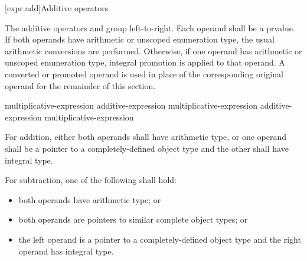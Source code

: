 %
%
%
%
%

[expr.add]{Additive operators}%
%

\pnum
The additive operators \tcode{+} and \tcode{-} group left-to-right.
Each operand shall be a prvalue.
If both operands have arithmetic or unscoped enumeration type,
the usual arithmetic conversions are performed.
Otherwise, if one operand has arithmetic or unscoped enumeration type,
integral promotion is applied to that operand.
A converted or promoted operand is used in place of
the corresponding original operand for the remainder of this section.

%
%
%
%
%
%
%
\begin{bnf}
\br
    multiplicative-expression\br
    additive-expression \terminal{+} multiplicative-expression\br
    additive-expression \terminal{-} multiplicative-expression
\end{bnf}

%
For addition, either both operands shall have arithmetic
type, or one operand shall be a pointer to a completely-defined object
type and the other shall have integral type.

\pnum
For subtraction, one of the following shall hold:
\begin{itemize}
\item both operands have arithmetic type; or

\item
{}%
both operands are pointers
to similar complete object types; or

\item the left operand is a pointer to a completely-defined object type
and the right operand has integral type.
\end{itemize}

